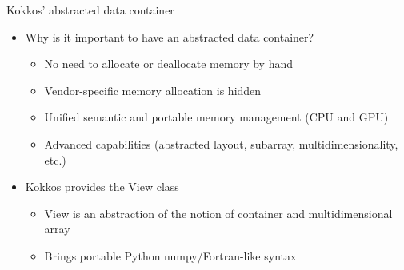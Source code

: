 \documentclass[
    aspectratio=169,
]{beamer}
\begin{document}
\begin{frame}[fragile]{Kokkos' abstracted data container}
    \begin{itemize}
        \item Why is it important to have an abstracted data container?
        \begin{itemize}
            \item No need to allocate or deallocate memory by hand
            \item Vendor-specific memory allocation is hidden
            \item Unified semantic and portable memory management (CPU and GPU)
            \item Advanced capabilities (abstracted layout, subarray, multidimensionality, etc.)
        \end{itemize}
        \item Kokkos provides the View class
        \begin{itemize}
            \item View is an abstraction of the notion of container and multidimensional array
            \item Brings portable Python numpy/Fortran-like syntax
        \end{itemize}
    \end{itemize}
\end{frame}

\end{document}
